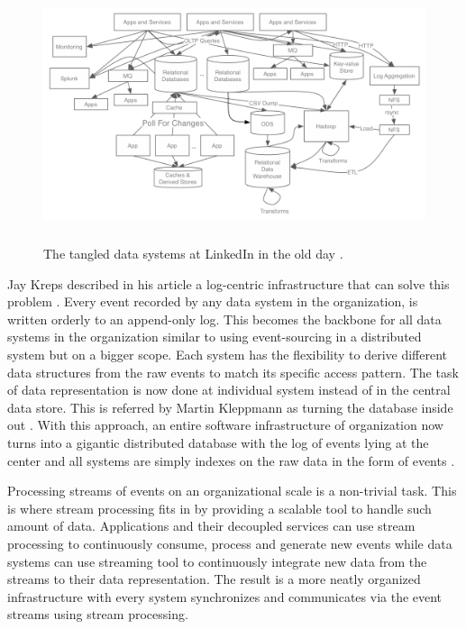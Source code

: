 \begin{figure}[h]
	\includegraphics[width=\linewidth,height=7.5cm]{images/linkedin-data-flow-ugly.png}
	\caption{The tangled data systems at LinkedIn in the old day \cite{eventstreamingplatform}.}
	\label{fig:tangledsystem}
\end{figure}

Jay Kreps described in his article a log-centric infrastructure that can solve this problem \cite{logjaykreps}. Every event recorded by any data system in the organization, is written orderly to an append-only log. This becomes the backbone for all data systems in the organization similar to using event-sourcing in a distributed system but on a bigger scope. Each system has the flexibility to derive different data structures from the raw events to match its specific access pattern. The task of data representation is now done at individual system instead of in the central data store. This is referred by Martin Kleppmann as turning the database inside out \cite{kleppmann2016making}. With this approach, an entire software infrastructure of organization now turns into a gigantic distributed database with the log of events lying at the center and all systems are simply indexes on the raw data in the form of events \cite{logjaykreps}. 



Processing streams of events on an organizational scale is a non-trivial task. This is where stream processing fits in by providing a scalable tool to handle such amount of data. Applications and their decoupled services can use stream processing to continuously consume, process and generate new events while data systems can use streaming tool to continuously integrate new data from the streams to their data representation. The result is a more neatly organized infrastructure with every system synchronizes and communicates via the event streams using stream processing. 

